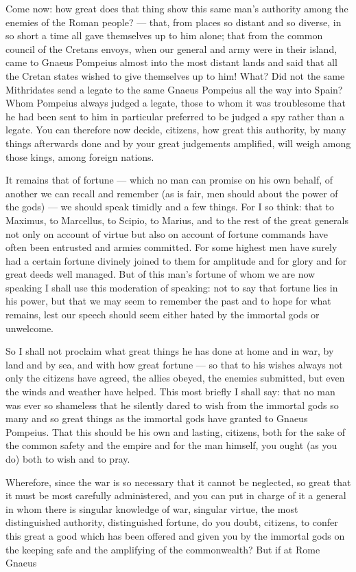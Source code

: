  Come now: how great does that thing show this same man's authority among the enemies of the Roman people? --- that, from places so distant and so diverse, in so short a time all gave themselves up to him alone; that from the common council of the Cretans envoys, when our general and army were in their island, came to Gnaeus Pompeius almost into the most distant lands and said that all the Cretan states wished to give themselves up to him! What? Did not the same Mithridates send a legate to the same Gnaeus Pompeius all the way into Spain? Whom Pompeius always judged a legate, those to whom it was troublesome that he had been sent to him in particular preferred to be judged a spy rather than a legate. You can therefore now decide, citizens, how great this authority, by many things afterwards done and by your great judgements amplified, will weigh among those kings, among foreign nations.

 It remains that of fortune --- which no man can promise on his own behalf, of another we can recall and remember (as is fair, men should about the power of the gods) --- we should speak timidly and a few things. For I so think: that to Maximus, to Marcellus, to Scipio, to Marius, and to the rest of the great generals not only on account of virtue but also on account of fortune commands have often been entrusted and armies committed. For some highest men have surely had a certain fortune divinely joined to them for amplitude and for glory and for great deeds well managed. But of this man's fortune of whom we are now speaking I shall use this moderation of speaking: not to say that fortune lies in his power, but that we may seem to remember the past and to hope for what remains, lest our speech should seem either hated by the immortal gods or unwelcome.

 So I shall not proclaim what great things he has done at home and in war, by land and by sea, and with how great fortune --- so that to his wishes always not only the citizens have agreed, the allies obeyed, the enemies submitted, but even the winds and weather have helped. This most briefly I shall say: that no man was ever so shameless that he silently dared to wish from the immortal gods so many and so great things as the immortal gods have granted to Gnaeus Pompeius. That this should be his own and lasting, citizens, both for the sake of the common safety and the empire and for the man himself, you ought (as you do) both to wish and to pray.

 Wherefore, since the war is so necessary that it cannot be neglected, so great that it must be most carefully administered, and you can put in charge of it a general in whom there is singular knowledge of war, singular virtue, the most distinguished authority, distinguished fortune, do you doubt, citizens, to confer this great a good which has been offered and given you by the immortal gods on the keeping safe and the amplifying of the commonwealth? But if at Rome Gnaeus


